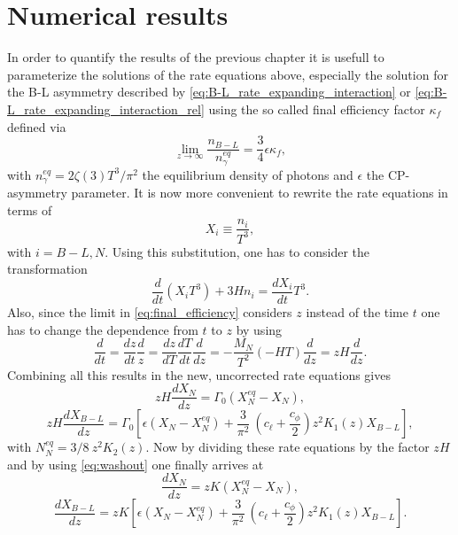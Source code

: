 \chapter{Numerical results} \label{sec:num_results}
In order to quantify the results of the previous chapter it is usefull to parameterize the solutions of the rate equations above, especially the solution for the B-L asymmetry described by \eqref{eq:B-L_rate_expanding_interaction} or \eqref{eq:B-L_rate_expanding_interaction_rel} using the so called final efficiency factor $\kappa_f$ defined via
\begin{equation}
\lim\limits_{z\rightarrow\infty}\frac{n_{B-L}}{n_\gamma^{eq}}=\frac{3}{4}\epsilon\kappa_f,
\label{eq:final_efficiency}
\end{equation}
with $n_\gamma^{eq}=2\zeta(3)T^3/\pi^2$ the equilibrium density of photons and $\epsilon$ the CP-asymmetry parameter. It is now more convenient to rewrite the rate equations in terms of
\begin{equation}
	X_i\equiv\frac{n_i}{T^3},
	\label{eq:X_i}
\end{equation}
 with $i=B-L,N$. Using this substitution, one has to consider the transformation \cite[Eq. 7.1]{Wormann:2016yyi}
\begin{equation}
\frac{d}{dt}(X_iT^3)+3Hn_i=\frac{dX_i}{dt}T^3.
\end{equation}
Also, since the limit in \eqref{eq:final_efficiency} considers $z$ instead of the time $t$ one has to change the dependence from $t$ to $z$ by using
\begin{equation}
\frac{d}{dt}=\frac{dz}{dt}\frac{d}{z}=\frac{dz}{dT}\frac{dT}{dt}\frac{d}{dz}=-\frac{M_N}{T^2}(-HT)\frac{d}{dz}=zH\frac{d}{dz}.
\end{equation}
Combining all this results in the new, uncorrected rate equations gives
\begin{equation*}
zH\frac{dX_N}{dz}=\Gamma_0\left(X_N^{eq}-X_N\right),
\end{equation*}
\begin{equation*}
zH\frac{dX_{B-L}}{dz}=\Gamma_0\left[\epsilon\left(X_N-X_N^{eq}\right)+\frac{3}{\pi^2}\:\left(c_\ell+\frac{c_\phi}{2}\right)z^2K_1(z)X_{B-L}\right],
\end{equation*}
with $N_N^{eq}=3/8\:z^2K_2(z)$.
Now by dividing these rate equations by the factor $zH$ and by using \eqref{eq:washout} one finally arrives at
\begin{equation}
\frac{dX_N}{dz}=zK\left(X_N^{eq}-X_N\right),
\end{equation}
\begin{equation}
\frac{dX_{B-L}}{dz}=zK\left[\epsilon\left(X_N-X_N^{eq}\right)+\frac{3}{\pi^2}\:\left(c_\ell+\frac{c_\phi}{2}\right)z^2K_1(z)X_{B-L}\right].
\label{eq:X_B-L}
\end{equation}
